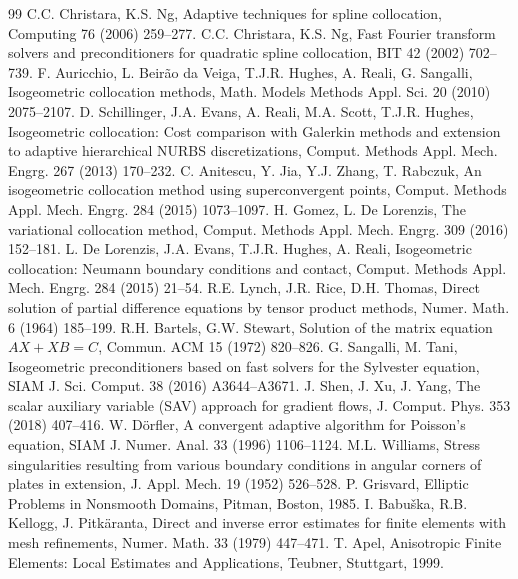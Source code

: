 \documentclass[preprint,12pt]{elsarticle}
\theoremstyle{remark}
\begin{document}
\begin{thebibliography}{99}
 C.C. Christara, K.S. Ng, Adaptive techniques for spline collocation, Computing 76 (2006) 259--277.
 C.C. Christara, K.S. Ng, Fast Fourier transform solvers and preconditioners for quadratic spline collocation, BIT 42 (2002) 702--739.
 F. Auricchio, L. Beir\~ao da Veiga, T.J.R. Hughes, A. Reali, G. Sangalli, Isogeometric collocation methods, Math. Models Methods Appl. Sci. 20 (2010) 2075--2107.
 D. Schillinger, J.A. Evans, A. Reali, M.A. Scott, T.J.R. Hughes, Isogeometric collocation: Cost comparison with Galerkin methods and extension to adaptive hierarchical NURBS discretizations, Comput. Methods Appl. Mech. Engrg. 267 (2013) 170--232.
 C. Anitescu, Y. Jia, Y.J. Zhang, T. Rabczuk, An isogeometric collocation method using superconvergent points, Comput. Methods Appl. Mech. Engrg. 284 (2015) 1073--1097.
 H. Gomez, L. De Lorenzis, The variational collocation method, Comput. Methods Appl. Mech. Engrg. 309 (2016) 152--181.
 L. De Lorenzis, J.A. Evans, T.J.R. Hughes, A. Reali, Isogeometric collocation: Neumann boundary conditions and contact, Comput. Methods Appl. Mech. Engrg. 284 (2015) 21--54.
 R.E. Lynch, J.R. Rice, D.H. Thomas, Direct solution of partial difference equations by tensor product methods, Numer. Math. 6 (1964) 185--199.
 R.H. Bartels, G.W. Stewart, Solution of the matrix equation $AX+XB=C$, Commun. ACM 15 (1972) 820--826.
 G. Sangalli, M. Tani, Isogeometric preconditioners based on fast solvers for the Sylvester equation, SIAM J. Sci. Comput. 38 (2016) A3644--A3671.
 J. Shen, J. Xu, J. Yang, The scalar auxiliary variable (SAV) approach for gradient flows, J. Comput. Phys. 353 (2018) 407--416.
 W. D\"orfler, A convergent adaptive algorithm for Poisson's equation, SIAM J. Numer. Anal. 33 (1996) 1106--1124.
 M.L. Williams, Stress singularities resulting from various boundary conditions in angular corners of plates in extension, J. Appl. Mech. 19 (1952) 526--528.
 P. Grisvard, Elliptic Problems in Nonsmooth Domains, Pitman, Boston, 1985.
 I. Babu\v{s}ka, R.B. Kellogg, J. Pitk\"aranta, Direct and inverse error estimates for finite elements with mesh refinements, Numer. Math. 33 (1979) 447--471.
 T. Apel, Anisotropic Finite Elements: Local Estimates and Applications, Teubner, Stuttgart, 1999.
\end{thebibliography}
\end{document}
